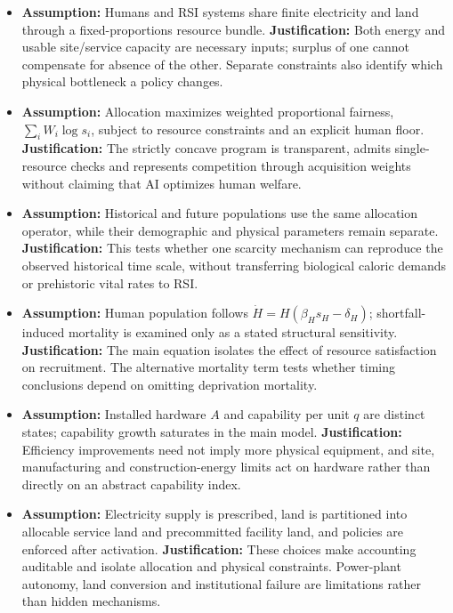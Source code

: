 \documentclass[12pt,a4paper]{article}
\theoremstyle{remark}
\begin{document}
\begin{itemize}
\item \textbf{Assumption:} Humans and RSI systems share finite electricity and land through a fixed-proportions resource bundle.
\textbf{Justification:} Both energy and usable site/service capacity are necessary inputs; surplus of one cannot compensate for absence of the other. Separate constraints also identify which physical bottleneck a policy changes.

\item \textbf{Assumption:} Allocation maximizes weighted proportional fairness, $\sum_i W_i\log s_i$, subject to resource constraints and an explicit human floor.
\textbf{Justification:} The strictly concave program is transparent, admits single-resource checks and represents competition through acquisition weights without claiming that AI optimizes human welfare.

\item \textbf{Assumption:} Historical and future populations use the same allocation operator, while their demographic and physical parameters remain separate.
\textbf{Justification:} This tests whether one scarcity mechanism can reproduce the observed historical time scale, without transferring biological caloric demands or prehistoric vital rates to RSI.

\item \textbf{Assumption:} Human population follows $\dot H=H(\beta_Hs_H-\delta_H)$; shortfall-induced mortality is examined only as a stated structural sensitivity.
\textbf{Justification:} The main equation isolates the effect of resource satisfaction on recruitment. The alternative mortality term tests whether timing conclusions depend on omitting deprivation mortality.

\item \textbf{Assumption:} Installed hardware $A$ and capability per unit $q$ are distinct states; capability growth saturates in the main model.
\textbf{Justification:} Efficiency improvements need not imply more physical equipment, and site, manufacturing and construction-energy limits act on hardware rather than directly on an abstract capability index.

\item \textbf{Assumption:} Electricity supply is prescribed, land is partitioned into allocable service land and precommitted facility land, and policies are enforced after activation.
\textbf{Justification:} These choices make accounting auditable and isolate allocation and physical constraints. Power-plant autonomy, land conversion and institutional failure are limitations rather than hidden mechanisms.


\end{itemize}
\end{document}

